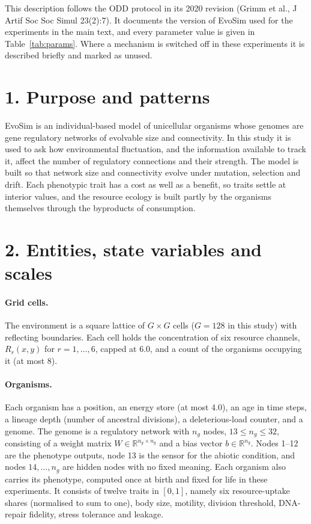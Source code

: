 


This description follows the ODD protocol in its 2020 revision (Grimm et al.,
J Artif Soc Soc Simul 23(2):7). It documents the version of EvoSim used for the
experiments in the main text, and every parameter value is given in
Table~\ref{tab:params}. Where a mechanism is switched off in these experiments it
is described briefly and marked as unused.

\section*{1. Purpose and patterns}
EvoSim is an individual-based model of unicellular organisms whose genomes are
gene regulatory networks of evolvable size and connectivity. In this study it is
used to ask how environmental fluctuation, and the information available to track
it, affect the number of regulatory connections and their strength. The model is built so that network size and connectivity evolve under mutation, selection and drift. Each phenotypic trait has a cost as well as a benefit, so traits settle at interior values, and the resource ecology is built partly by the organisms themselves through the byproducts of consumption.

\section*{2. Entities, state variables and scales}

\paragraph*{Grid cells.} The environment is a square lattice of $G\times G$ cells
($G=128$ in this study) with reflecting boundaries. Each cell holds the concentration of
six resource channels, $R_{r}(x,y)$ for $r=1,\dots,6$, capped at 6.0, and a count of
the organisms occupying it (at most 8).

\paragraph*{Organisms.} Each organism has a position, an energy store (at most
4.0), an age in time steps, a lineage depth (number of ancestral divisions), a
deleterious-load counter, and a genome. The genome is a regulatory network with
$n_g$ nodes, $13 \le n_g \le 32$, consisting of a weight matrix
$W\in\mathbb{R}^{n_g\times n_g}$ and a bias vector $b\in\mathbb{R}^{n_g}$. Nodes
1--12 are the phenotype outputs, node 13 is the sensor for the abiotic condition,
and nodes $14,\dots,n_g$ are hidden nodes with no fixed meaning. Each organism
also carries its phenotype, computed once at birth and fixed for life in these experiments. It consists of twelve traits in $[0,1]$, namely six resource-uptake shares (normalised to sum to one), body size,
motility, division threshold, DNA-repair fidelity, stress tolerance and leakage.

